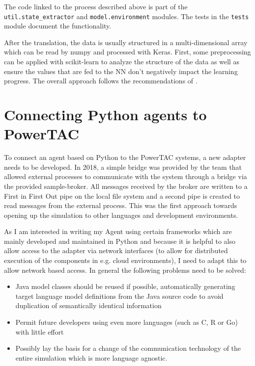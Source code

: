 The code linked to the process described above is part of the \texttt{util.state\_extractor} and
\texttt{model.environment} modules. The tests in the \texttt{tests} module document the functionality.

After the translation, the data is usually structured in a multi-dimensional array which can be read by numpy and
processed with Keras. First, some preprocessing can be applied with scikit-learn to analyze the structure of the data as
well as ensure the values that are fed to the \ac {NN} don't negatively impact the learning progress. The overall
approach follows the recommendations of \citep{Goodfellow-et-al-2016}.  

\section{Connecting Python agents to PowerTAC}

To connect an agent based on Python to the \ac{PowerTAC} systems, a new adapter needs to be developed. In 2018, a simple
bridge was provided by the team that allowed external processes to communicate with the system through a bridge via the
provided sample-broker. All messages received by the broker are written to a First in First Out pipe on the local file
system and a second pipe is created to read messages from the external process. This was the first approach towards opening up the simulation to other languages and development environments. 

As I am interested in writing my Agent using certain frameworks which are mainly developed and maintained in Python and because it is helpful to also allow access to the adapter via network interfaces (to allow for distributed execution of the components in e.g. cloud environments), I need to adapt this to allow network based access. In general the following problems need to be solved:

\begin{itemize}
	\item Java model classes should be reused if possible, automatically generating target language model definitions from the Java source code to avoid duplication of semantically identical information
	\item Permit future developers using even more languages (such as C, R or Go) with little effort
	\item Possibly lay the basis for a change of the communication technology of the entire simulation which is more language agnostic.
\end{itemize}

